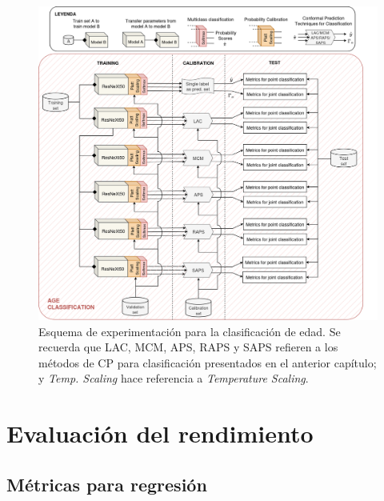 \begin{figure}[htbp]
    \centering
    \includegraphics[angle=90, width=\textwidth]{capitulos/cap_05/imagenes/AGC_experimental_pipeline.png}
    \caption[
        Esquema de experimentación para la clasificación de edad. 
    ]{
        Esquema de experimentación para la clasificación de edad. Se recuerda que LAC, MCM, APS, RAPS y SAPS refieren a los métodos de CP para clasificación presentados en el anterior capítulo; y \textit{Temp. Scaling} hace referencia a \textit{Temperature Scaling}.
    } 
    \label{fig:AGC_experimental_pipeline}
\end{figure}

\FloatBarrier



\section{Evaluación del rendimiento}


\subsection{Métricas para regresión}

